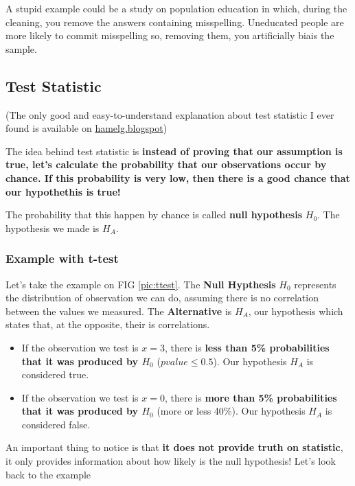 \documentclass[a4paper,11pt,twoside]{article}
\begin{document}
A stupid example could be a study on population education in which, during the cleaning, you remove the answers containing misspelling. Uneducated people are more likely to commit misspelling so, removing them, you artificially biais the sample.

\subsection{Test Statistic}

(The only good and easy-to-understand explanation about test statistic I ever found is available on \href{http://hamelg.blogspot.ch/2015/11/python-for-data-analysis-part-24.html?view=flipcard}{hamelg.blogspot})

The idea behind test statistic is \textbf{instead of proving that our assumption is true, let's calculate the probability that our observations occur by chance. If this probability is very low, then there is a good chance that our hypothethis is true!}

The probability that this happen by chance is called \textbf{null hypothesis} $H_0$. The hypothesis we made is $H_A$.

\subsubsection{Example with t-test}

Let's take the example on FIG \ref{pic:ttest}. The \textbf{Null Hypthesis} $H_0$ represents the distribution of observation we can do, assuming there is no correlation between the values we measured. The \textbf{Alternative} is $H_A$, our hypothesis which states that, at the opposite, their is correlations.
\begin{itemize}
	\item If the observation we test is $x=3$, there is \textbf{less than 5\% probabilities that it was produced by $H_0$} ($pvalue \leq 0.5$). Our hypothesis $H_A$ is considered true.

	\item If the observation we test is $x=0$, there is \textbf{more than 5\% probabilities that it was produced by $H_0$} (more or less 40\%). Our hypothesis $H_A$ is considered false.
\end{itemize}

{\color{red} An important thing to notice is that \textbf{it does not provide truth on statistic}, it only provides information about how likely is the null hypothesis! Let's look back to the example}
\end{document}
